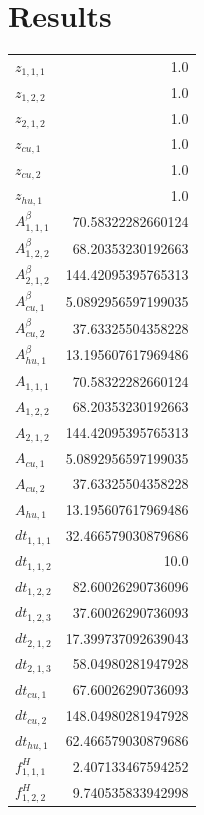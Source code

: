 \documentclass{article}%
\makeatletter
\let\mcnewpage=\newpage%
\newcommand{\TrickSupertabularIntoMulticols}{%
\renewcommand\newpage{%
\if@firstcolumn%
\hrule width\linewidth height0pt%
\columnbreak%
\else%
\mcnewpage%
\fi%
}%
}%
\makeatother
\begin{document}
\section{Results}%
\thispagestyle{plain}%
\begin{multicols*}{3}%
\TrickSupertabularIntoMulticols%
%
\begin{supertabular}{lr}%
	$z_{1,1,1}$ & 1.0 \\%
	$z_{1,2,2}$ & 1.0 \\%
	$z_{2,1,2}$ & 1.0 \\%
	$z_{cu,1}$ & 1.0 \\%
	$z_{cu,2}$ & 1.0 \\%
	$z_{hu,1}$ & 1.0 \\%
	$A_{1,1,1}^{\beta}$ & 70.58322282660124 \\%
	$A_{1,2,2}^{\beta}$ & 68.20353230192663 \\%
	$A_{2,1,2}^{\beta}$ & 144.42095395765313 \\%
	$A_{cu,1}^{\beta}$ & 5.0892956597199035 \\%
	$A_{cu,2}^{\beta}$ & 37.63325504358228 \\%
	$A_{hu,1}^{\beta}$ & 13.195607617969486 \\%
	$A_{1,1,1}$ & 70.58322282660124 \\%
	$A_{1,2,2}$ & 68.20353230192663 \\%
	$A_{2,1,2}$ & 144.42095395765313 \\%
	$A_{cu,1}$ & 5.0892956597199035 \\%
	$A_{cu,2}$ & 37.63325504358228 \\%
	$A_{hu,1}$ & 13.195607617969486 \\%
	$dt_{1,1,1}$ & 32.466579030879686 \\%
	$dt_{1,1,2}$ & 10.0 \\%
	$dt_{1,2,2}$ & 82.60026290736096 \\%
	$dt_{1,2,3}$ & 37.60026290736093 \\%
	$dt_{2,1,2}$ & 17.399737092639043 \\%
	$dt_{2,1,3}$ & 58.04980281947928 \\%
	$dt_{cu,1}$ & 67.60026290736093 \\%
	$dt_{cu,2}$ & 148.04980281947928 \\%
	$dt_{hu,1}$ & 62.466579030879686 \\%
	$f_{1,1,1}^{H}$ & 2.407133467594252 \\%
	$f_{1,2,2}^{H}$ & 9.740535833942998 \\%

\end{supertabular}
\end{multicols*}
\end{document}
